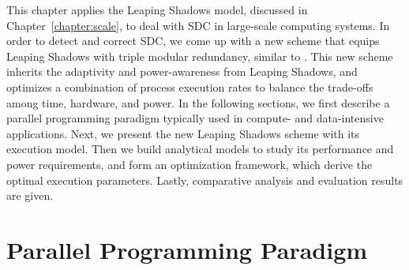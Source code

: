This chapter applies the Leaping Shadows model, discussed in Chapter~\ref{chapter:scale}, to deal with SDC in large-scale computing systems. In order to detect and correct SDC, we come up with a new scheme that equips Leaping Shadows with triple modular redundancy, similar to \cite{fiala_2012_sdc}. This new scheme inherits the adaptivity and power-awareness from Leaping Shadows, and optimizes a combination of process execution rates to balance the trade-offs among time, hardware, and power. In the following sections, we first describe a parallel programming paradigm typically used in compute- and data-intensive applications. Next, we
present the new Leaping Shadows scheme with its execution model. Then we build analytical models to study its performance and power requirements, and form an optimization framework, which derive the optimal execution parameters. Lastly, comparative analysis and evaluation results are given.  



\section{Parallel Programming Paradigm}

